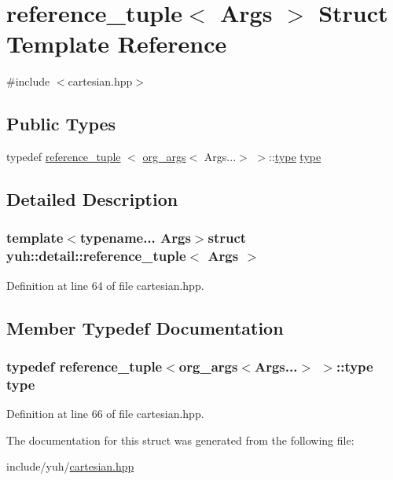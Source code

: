 \hypertarget{structyuh_1_1detail_1_1reference__tuple}{\section{reference\-\_\-tuple$<$ \-Args $>$ \-Struct \-Template \-Reference}
\label{dc/d74/structyuh_1_1detail_1_1reference__tuple}
}


{\ttfamily \#include $<$cartesian.\-hpp$>$}

\subsection*{\-Public \-Types}
\begin{DoxyCompactItemize}
\item 
typedef \hyperlink{structyuh_1_1detail_1_1reference__tuple}{reference\-\_\-tuple}\*
$<$ \hyperlink{structyuh_1_1detail_1_1org__args}{org\-\_\-args}$<$ \-Args...$>$ $>$\-::\hyperlink{structyuh_1_1detail_1_1reference__tuple_a15c6e1033d756629928799ec620412ba}{type} \hyperlink{structyuh_1_1detail_1_1reference__tuple_a15c6e1033d756629928799ec620412ba}{type}
\end{DoxyCompactItemize}


\subsection{\-Detailed \-Description}
\subsubsection*{template$<$typename... \-Args$>$struct yuh\-::detail\-::reference\-\_\-tuple$<$ Args $>$}



\-Definition at line 64 of file cartesian.\-hpp.



\subsection{\-Member \-Typedef \-Documentation}
\hypertarget{structyuh_1_1detail_1_1reference__tuple_a15c6e1033d756629928799ec620412ba}{
\subsubsection[{type}]{\setlength{\rightskip}{0pt plus 5cm}typedef {\bf reference\-\_\-tuple}$<${\bf org\-\_\-args}$<$\-Args...$>$ $>$\-::{\bf type} {\bf type}}}\label{dc/d74/structyuh_1_1detail_1_1reference__tuple_a15c6e1033d756629928799ec620412ba}


\-Definition at line 66 of file cartesian.\-hpp.



\-The documentation for this struct was generated from the following file\-:\begin{DoxyCompactItemize}
\item 
include/yuh/\hyperlink{cartesian_8hpp}{cartesian.\-hpp}\end{DoxyCompactItemize}
